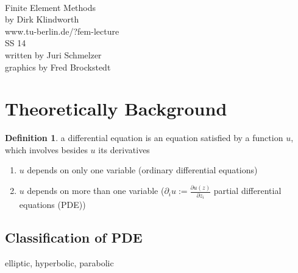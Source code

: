 \documentclass[english]{article}
\theoremstyle{definition}
\newtheorem*{defi}{Definition}
\theoremstyle{remark}
\newcommand{\f}[2]{\frac{#1}{#2}}							%
\newcommand{\p}{\partial}
\begin{document}
\begin{titlepage}
  \begin{center}
    \ \\
    \vspace{03mm}
    {\huge Finite Element Methods\\}
    \vspace{12mm}
    {\Large by Dirk Klindworth}\\
    www.tu-berlin.de/?fem-lecture
    \vspace{12mm}\\
    {\Large  {SS 14\\ }}
    \vspace{15mm}
    {\Large written by Juri Schmelzer  \\
                         graphics by Fred Brockstedt}
  \end{center}
\end{titlepage}
\newpage
\tableofcontents
\newpage
\section{Theoretically Background}
\begin{defi} a differential equation is an equation satisfied by a function $u$, which involves besides $u$ its derivatives
  \begin{enumerate}
  \item $u$ depends on only one variable (ordinary differential equations)
  \item $u$ depends on more than one variable ($\p_i u:= \f{\p u (z)}{\p z_i}$ partial differential equations (PDE))
  \end{enumerate}
\end{defi}
\subsection{Classification of PDE}
elliptic, hyperbolic, parabolic
\end{document}
